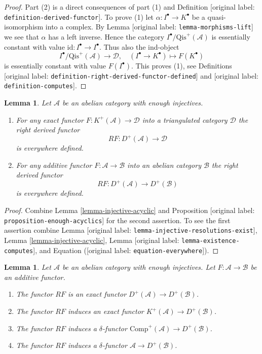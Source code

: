 \documentclass[10pt,a4paper]{article}
\theoremstyle{plain}
\newtheorem{lemma}[subsection]{Lemma}
\theoremstyle{definition}
\theoremstyle{remark}
\numberwithin{equation}{subsection}
\begin{document}
\begin{proof}
Part (2) is a direct consequences of part (1) and
Definition [original label: \nolinkurl{definition-derived-functor}].
To prove (1) let $\alpha : I^\bullet \to K^\bullet$ be a quasi-isomorphism
into a complex. By
Lemma [original label: \nolinkurl{lemma-morphisms-lift}]
we see that $\alpha$ has a left inverse. Hence the category
$I^\bullet/\text{Qis}^{+}(\mathcal{A})$ is essentially constant with value
$\text{id} : I^\bullet \to I^\bullet$. Thus also the ind-object
$$
I^\bullet/\text{Qis}^{+}(\mathcal{A}) \longrightarrow \mathcal{D}, \quad
(I^\bullet \to K^\bullet) \longmapsto F(K^\bullet)
$$
is essentially constant with value $F(I^\bullet)$. This proves (1), see
Definitions [original label: \nolinkurl{definition-right-derived-functor-defined}] and
[original label: \nolinkurl{definition-computes}].
\end{proof}

\begin{lemma}
\label{lemma-enough-injectives-right-derived}
Let $\mathcal{A}$ be an abelian category with enough injectives.
\begin{enumerate}
\item For any exact functor $F : K^{+}(\mathcal{A}) \to \mathcal{D}$
into a triangulated category $\mathcal{D}$ the right derived
functor
$$
RF : D^{+}(\mathcal{A}) \longrightarrow \mathcal{D}
$$
is everywhere defined.
\item For any additive functor $F : \mathcal{A} \to \mathcal{B}$ into an
abelian category $\mathcal{B}$ the right derived functor
$$
RF : D^{+}(\mathcal{A}) \longrightarrow D^{+}(\mathcal{B})
$$
is everywhere defined.
\end{enumerate}
\end{lemma}

\begin{proof}
Combine
Lemma \ref{lemma-injective-acyclic}
and
Proposition [original label: \nolinkurl{proposition-enough-acyclics}]
for the second assertion. To see the first assertion combine
Lemma [original label: \nolinkurl{lemma-injective-resolutions-exist}],
Lemma \ref{lemma-injective-acyclic},
Lemma [original label: \nolinkurl{lemma-existence-computes}],
and Equation ([original label: \nolinkurl{equation-everywhere}]).
\end{proof}

\begin{lemma}
\label{lemma-right-derived-properties}
Let $\mathcal{A}$ be an abelian category with enough injectives.
Let $F : \mathcal{A} \to \mathcal{B}$ be an additive functor.
\begin{enumerate}
\item The functor $RF$ is an exact functor
$D^{+}(\mathcal{A}) \to D^{+}(\mathcal{B})$.
\item The functor $RF$ induces an exact functor
$K^{+}(\mathcal{A}) \to D^{+}(\mathcal{B})$.
\item The functor $RF$ induces a $\delta$-functor
$\text{Comp}^{+}(\mathcal{A}) \to D^{+}(\mathcal{B})$.
\item The functor $RF$ induces a $\delta$-functor
$\mathcal{A} \to D^{+}(\mathcal{B})$.
\end{enumerate}
\end{lemma}
\end{document}
